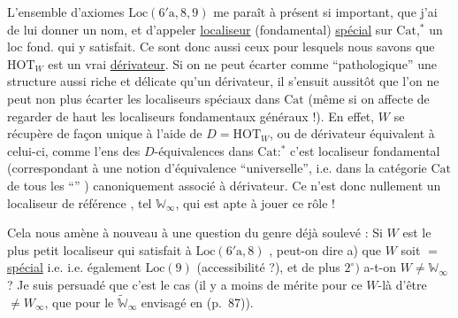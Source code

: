 L'ensemble d'axiomes $\mathrm{Loc}(6'\mathrm{a},8,9)$ me
paraît à présent si important, que j'ai
 de lui donner un nom, et
d'appeler \uline{localiseur} (fondamental) \uline{spécial}
sur $\mathrm{Cat}$,$^{\ast}$ un loc fond. qui y satisfait.
Ce sont donc aussi ceux pour lesquels
nous savons que $\mathrm{HOT}_{W}$ est un
vrai \uline{dérivateur}. Si on ne peut
écarter comme ``pathologique'' une
structure aussi riche et délicate qu'un
dérivateur, il s'ensuit aussitôt que
l'on ne peut non plus écarter  les
localiseurs spéciaux dans $\mathrm{Cat}$ (même
si on affecte de regarder de haut les
localiseurs fondamentaux généraux !). En
effet, $W$ se récupère de façon unique
à l'aide de $D=\mathrm{HOT}_{W}$, ou de 
dérivateur équivalent à celui-ci,
comme l'ens des $D$-équivalences dans
$\mathrm{Cat}$:$^{\ast}$ c'est  localiseur fondamental
(correspondant à une notion d'équivalence
``universelle'', i.e. dans la catégorie $\mathrm{Cat}$
de tous les ``'' )
canoniquement associé à  dérivateur.
Ce n'est donc nullement un localiseur
de référence , tel $\mathbb{W}_{\infty}$,
qui est apte à jouer ce rôle !

Cela nous amène à nouveau à une
question du genre déjà soulevé : Si
$W$  est le plus petit localiseur qui
satisfait à $\mathrm{Loc}(6'\mathrm{a},8)$ , peut-on
dire a) que $W$ soit $=$ \uline{spécial} i.e.
i.e.  également $\mathrm{Loc}(9)$ (accessibilité ?),
et de plus $2^{\circ})$ a-t-on $W\ne\mathbb{W}_{\infty}$ ? Je
suis persuadé que c'est le cas (il
y a moins de mérite pour ce $W$-là
d'être $\ne W_{\infty}$, que pour le $\widetilde{\mathbb{W}}_{\infty}$
envisagé en  (p.~87)).

